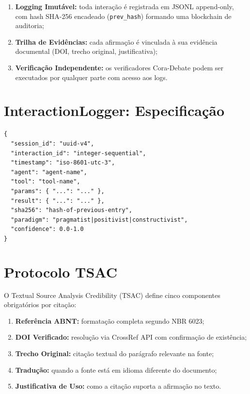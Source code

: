 \documentclass[12pt,a4paper,sumario=tradicional]{abntex2}
\begin{document}
\begin{enumerate}[leftmargin=*]
    \item \textbf{Logging Imutável:} toda interação é registrada em JSONL append-only, com hash SHA-256 encadeado (\texttt{prev\_hash}) formando uma blockchain de auditoria;
    \item \textbf{Trilha de Evidências:} cada afirmação é vinculada à sua evidência documental (DOI, trecho original, justificativa);
    \item \textbf{Verificação Independente:} os verificadores Cora-Debate podem ser executados por qualquer parte com acesso aos logs.
\end{enumerate}

\section{InteractionLogger: Especificação}

\begin{lstlisting}[language={}]
{
  "session_id": "uuid-v4",
  "interaction_id": "integer-sequential",
  "timestamp": "iso-8601-utc-3",
  "agent": "agent-name",
  "tool": "tool-name",
  "params": { "...": "..." },
  "result": { "...": "..." },
  "sha256": "hash-of-previous-entry",
  "paradigm": "pragmatist|positivist|constructivist",
  "confidence": 0.0-1.0
}
\end{lstlisting}

\section{Protocolo TSAC}

O Textual Source Analysis Credibility (TSAC) define cinco componentes obrigatórios por citação:

\begin{enumerate}[leftmargin=*]
    \item \textbf{Referência ABNT:} formatação completa segundo NBR 6023;
    \item \textbf{DOI Verificado:} resolução via CrossRef API com confirmação de existência;
    \item \textbf{Trecho Original:} citação textual do parágrafo relevante na fonte;
    \item \textbf{Tradução:} quando a fonte está em idioma diferente do documento;
    \item \textbf{Justificativa de Uso:} como a citação suporta a afirmação no texto.
\end{enumerate}
\end{document}
